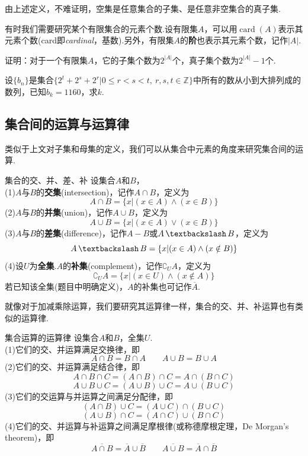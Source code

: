 \documentclass[lang=cn, zihao=4.5]{elegantbook}
\DeclareMathOperator{\card}{card}
\DeclareMathOperator{\setjianfa}{\textbackslash}
\begin{document}
由上述定义，不难证明，空集是任意集合的子集、是任意非空集合的真子集.

有时我们需要研究某个有限集合的元素个数.设有限集$A$，可以用$\card (A)$表示其元素个数(card即\textit{cardinal}，基数).另外，有限集$A$的\textbf{阶}也表示其元素个数，记作$|A|$.

\begin{example}
	证明：对于一个有限集$A$，它的子集个数为$2^{|A|}$个，真子集个数为$2^{|A|}-1$个.
\end{example}
\begin{solution}
\end{solution}
\begin{example}
	设$\{ b_n \}$是集合$\{ 2^t+2^s+2^r | 0 \leq r < s < t,~r,s,t \in \mathbb{Z} \}$中所有的数从小到大排列成的数列，已知$b_k=1160$，求$k$.
\end{example}
\begin{solution}
\end{solution}

\subsection{集合间的运算与运算律}

类似于上文对子集和母集的定义，我们可以从集合中元素的角度来研究集合间的运算.

\begin{definition}{集合的交、并、差、补}
	设集合$A$和$B$， \\
	(1)$A$与$B$的\textbf{交集}(intersection)，记作$A \cap B$，定义为$$A \cap B = \{ x|(x \in A) \wedge (x \in B) \}$$
	(2)$A$与$B$的\textbf{并集}(union)，记作$A \cup B$，定义为$$A \cup B = \{ x|(x \in A) \vee (x \in B) \}$$
	(3)$A$与$B$的\textbf{差集}(difference)，记作$A-B$或$A \setjianfa B$，定义为$$A \setjianfa B = \{ x|(x \in A) \wedge (x \notin B) \}$$
	(4)设$U$为\textbf{全集}.$A$的\textbf{补集}(complement)，记作$\complement _{U}{A}$，定义为$$\complement _{U}{A} = \{ x|(x \in U) \wedge (x \notin A) \}$$
	若已知该全集(题目中明确定义)，$A$的补集也可记作$\overline{A}$.
\end{definition}

就像对于加减乘除运算，我们要研究其运算律一样，集合的交、并、补运算也有类似的运算律.

\begin{proposition}{集合运算的运算律}
	设集合$A$和$B$，全集$U$. \\
	(1)它们的交、并运算满足交换律，即$$A \cap B = B \cap A \qquad A \cup B = B \cup A$$
	(2)它们的交、并运算满足结合律，即
	$$A \cap B \cap C = (A \cap B) \cap C = A \cap (B \cap C)$$
	$$A \cup B \cup C = (A \cup B) \cup C = A \cup (B \cup C)$$
	(3)它们的交运算与并运算之间满足分配律，即
	$$(A \cap B) \cup C = (A \cup C) \cap (B \cup C)$$
	$$(A \cup B) \cap C = (A \cap C) \cup (B \cap C)$$
	(4)它们的交、并运算与补运算之间满足摩根律(或称德摩根定理，De Morgan's theorem)，即$$\overline{A \cap B} = \overline{A} \cup \overline{B} \qquad \overline{A \cup B} = \overline{A} \cap \overline{B}$$
\end{proposition}
\end{document}
